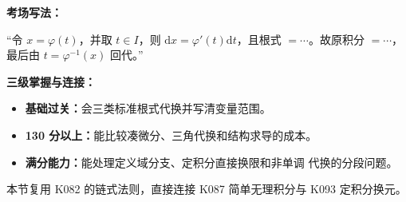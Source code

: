\begin{knowledgeBox}
\textbf{考场写法：}

“令 \(x=\varphi(t)\)，并取 \(t\in I\)，则
\(\mathrm dx=\varphi'(t)\mathrm dt\)，且根式 \(=\cdots\)。故原积分
\(=\cdots\)，最后由 \(t=\varphi^{-1}(x)\) 回代。”

\textbf{三级掌握与连接：}
\begin{itemize}
  \item \textbf{基础过关：}会三类标准根式代换并写清变量范围。
  \item \textbf{130 分以上：}能比较凑微分、三角代换和结构求导的成本。
  \item \textbf{满分能力：}能处理定义域分支、定积分直接换限和非单调
  代换的分段问题。
\end{itemize}
本节复用 K082 的链式法则，直接连接 K087 简单无理积分与 K093
定积分换元。
\end{knowledgeBox}


\par

